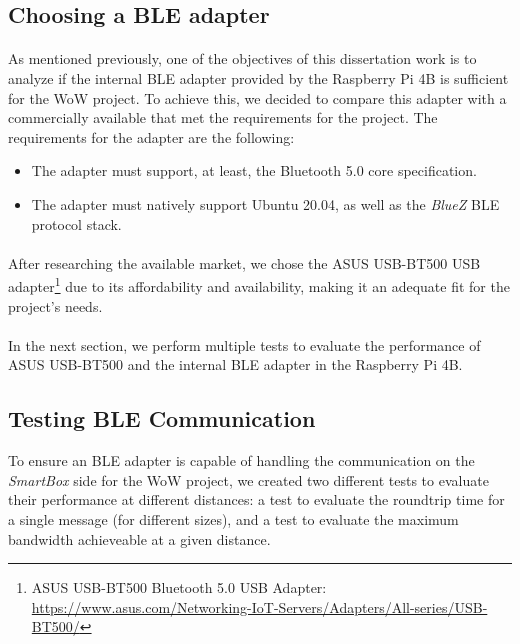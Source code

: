 \subsection{Choosing a \acs{BLE} adapter} 

\paragraph{} As mentioned previously, one of the objectives of this dissertation work is to analyze if the internal \acs{BLE} adapter provided by the Raspberry Pi 4B is sufficient for the \acs{WoW} project. To achieve this, we decided to compare this adapter with a commercially available that met the requirements for the project. The requirements for the adapter are the following:

\begin{itemize}
    \item The adapter must support, at least, the Bluetooth 5.0 core specification.
    \item The adapter must natively support Ubuntu 20.04, as well as the \textit{BlueZ} \acs{BLE} protocol stack. 
\end{itemize}

\paragraph{} After researching the available market, we chose the ASUS USB-BT500 USB adapter\footnote{ASUS USB-BT500 Bluetooth 5.0 USB Adapter: \url{https://www.asus.com/Networking-IoT-Servers/Adapters/All-series/USB-BT500/}} due to its affordability and availability, making it an adequate fit for the project's needs.

\paragraph{} In the next section, we perform multiple tests to evaluate the performance of ASUS USB-BT500 and the internal \acs{BLE} adapter in the Raspberry Pi 4B.

\subsection{Testing \acs{BLE} Communication} 

To ensure an \acs{BLE} adapter is capable of handling the communication on the \textit{SmartBox} side for the \acs{WoW} project, we created two different tests to evaluate their performance at different distances: a test to evaluate the roundtrip time for a single message (for different sizes), and a test to evaluate the maximum bandwidth achieveable at a given distance.

